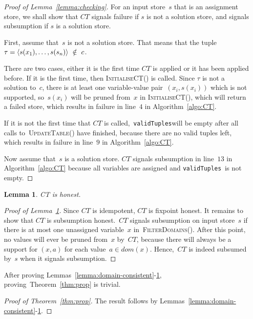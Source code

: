 \documentclass[a4paper,11pt]{article}
\newtheorem{lemma}[theorem]{Lemma}
\newcommand{\Algoref}[1]{Algorithm~\ref{#1}}
\newcommand{\Thmref}[1]{Theorem~\ref{#1}}
\newcommand{\Lemmaref}[1]{Lemma~\ref{#1}}
\newcommand{\CurrTable}{\texttt{validTuples}}
\def\UpdateTable{\textsc{UpdateTable}}
\def\FilterDomains{\textsc{FilterDomains}}
\def\InitialiseCT{\textsc{InitialiseCT}}
\numberwithin{equation}{section}
\begin{document}
\begin{proof}[Proof of \Lemmaref{lemma:checking}]
  For an input store~$s$ that is an assignment store, we shall show that $CT$
  signals failure if $s$ is not a solution store, and signals subsumption if
  $s$ is a solution store. 

  First, assume that~$s$ is not a solution store. That means that the tuple
  $\tau = \left\langle s(x_1),\ldots,s(s_n)\right\rangle~\notin~c$.
 
  There are two cases, either
  it is the first time $CT$ is applied or it has been applied before.
  If it is the first time, then \InitialiseCT() is called.
  Since $\tau$ is not a solution to~$c$, there is at least one variable-value
  pair~$(x_i,s(x_i))$ which is not supported, so~$s(x_i)$ will be pruned
  from~$x$ in \InitialiseCT(), which will return a failed store, which results
  in failure in line~$4$ in \Algoref{algo:CT}.

  If it is not the first time that $CT$ is called,~\CurrTable will be empty
  after all calls to~\UpdateTable() have finished, because there are no
  valid tuples left, which results in failure in line~$9$ in \Algoref{algo:CT}.
  
  Now assume that~$s$ is a solution store. 
  $CT$ signals subsumption in line~$13$ in \Algoref{algo:CT} because all
  variables are assigned and \CurrTable~is not empty.

\end{proof}

\begin{lemma}\label{lemma:honest}
  CT is honest.
\end{lemma}

\begin{proof}[Proof of \Lemmaref{lemma:honest}]
  Since $CT$ is idempotent, $CT$ is fixpoint honest. It remains to show that
  $CT$ is subsumption honest.~$CT$ signals subsumption on input store~$s$
  if there is at most one
  unassigned variable~$x$ in~\FilterDomains(). After this point, no values will
  ever be pruned from~$x$ by~$CT$, because there will always be a support for
  $(x,a)$ for each value~$a \in dom(x)$. Hence,~$CT$ is indeed subsumed by~$s$
  when it signals subsumption.
    
\end{proof}


After proving Lemmas~\ref{lemma:domain-consistent}-\ref{lemma:honest},
proving~\Thmref{thm:prop} is trivial.

\begin{proof}[Proof of \Thmref{thm:prop}]
  The result follows by Lemmas~\ref{lemma:domain-consistent}-\ref{lemma:honest}.
\end{proof}
\end{document}
